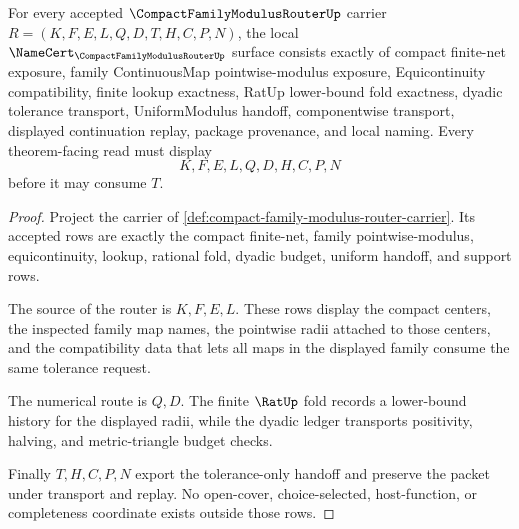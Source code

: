 \begin{theorem}
\label{thm:compact-family-modulus-router-namecert-obligations}
For every accepted $\CompactFamilyModulusRouterUp$ carrier $R=(K,F,E,L,Q,D,T,H,C,P,N)$, the local $\NameCert_{\CompactFamilyModulusRouterUp}$ surface consists exactly of compact finite-net exposure, family ContinuousMap pointwise-modulus exposure, Equicontinuity compatibility, finite lookup exactness, RatUp lower-bound fold exactness, dyadic tolerance transport, UniformModulus handoff, componentwise transport, displayed continuation replay, package provenance, and local naming. Every theorem-facing read must display
$$
K,F,E,L,Q,D,H,C,P,N
$$
before it may consume $T$.
\end{theorem}
\begin{proof}
Project the carrier of \autoref{def:compact-family-modulus-router-carrier}. Its accepted rows are exactly the compact finite-net, family pointwise-modulus, equicontinuity, lookup, rational fold, dyadic budget, uniform handoff, and support rows.

The source of the router is $K,F,E,L$. These rows display the compact centers, the inspected family map names, the pointwise radii attached to those centers, and the compatibility data that lets all maps in the displayed family consume the same tolerance request.

The numerical route is $Q,D$. The finite $\RatUp$ fold records a lower-bound history for the displayed radii, while the dyadic ledger transports positivity, halving, and metric-triangle budget checks.

Finally $T,H,C,P,N$ export the tolerance-only handoff and preserve the packet under transport and replay. No open-cover, choice-selected, host-function, or completeness coordinate exists outside those rows.
\end{proof}

